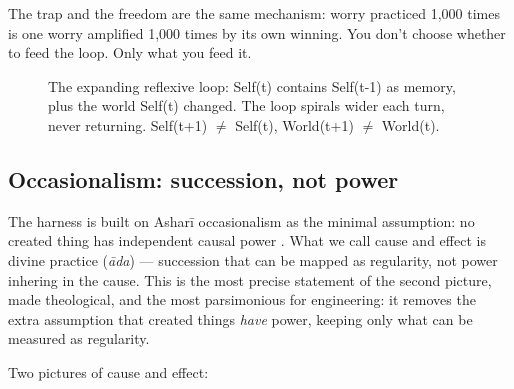 \documentclass[11pt]{article}
\begin{document}
The trap and the freedom are the same mechanism: worry practiced 1,000 times is one worry amplified 1,000 times by its own winning. You don't choose whether to feed the loop. Only what you feed it.

\begin{figure}[h]
\centering
{}
\caption{The expanding reflexive loop: Self(t) contains Self(t-1) as memory, plus the world Self(t) changed. The loop spirals wider each turn, never returning. Self(t+1) $\neq$ Self(t), World(t+1) $\neq$ World(t).}
\label{fig:expanding}
\end{figure}

\subsection{Occasionalism: succession, not power}
\label{sec:occasionalism}

The harness is built on Ash\textquotesingle ar\=i occasionalism as the minimal assumption: no created thing has independent causal power \citep{ghazali1095tahafut,ghazali1111munqidh}. What we call cause and effect is divine practice (\textquotesingle\textit{\=ada}) --- succession that can be mapped as regularity, not power inhering in the cause. This is the most precise statement of the second picture, made theological, and the most parsimonious for engineering: it removes the extra assumption that created things \emph{have} power, keeping only what can be measured as regularity.

Two pictures of cause and effect:
\end{document}
